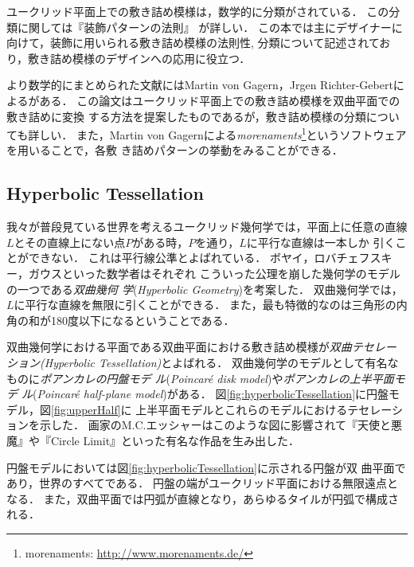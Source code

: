 ユークリッド平面上での敷き詰め模様は，数学的に分類がされている．
この分類に関しては『装飾パターンの法則』
\cite{fujitaｰ201507pattern}が詳しい．
この本では主にデザイナーに向けて，装飾に用いられる敷き詰め模様の法則性,
分類について記述されており，敷き詰め模様のデザインへの応用に役立つ．

より数学的にまとめられた文献にはMartin von Gagern，Jrgen
Richter-Gebertによる\cite{journals/combinatorics/GagernR09}がある．
この論文はユークリッド平面上での敷き詰め模様を双曲平面での敷き詰めに変換
する方法を提案したものであるが，敷き詰め模様の分類についても詳しい．
また，Martin von Gagernによる\emph{morenaments}\footnote{morenaments:
\url{http://www.morenaments.de/}}というソフトウェアを用いることで，各敷
き詰めパターンの挙動をみることができる．

\subsection{Hyperbolic Tessellation}

我々が普段見ている世界を考えるユークリッド幾何学では，平面上に任意の直線
$L$とその直線上にない点$P$がある時，$P$を通り，$L$に平行な直線は一本しか
引くことができない．
これは平行線公準とよばれている．
ボヤイ，ロバチェフスキー，ガウスといった数学者はそれぞれ
こういった公理を崩した幾何学のモデルの一つである\emph{双曲幾何
学}(\textit{Hyperbolic Geometry})を考案した．
双曲幾何学では，$L$に平行な直線を無限に引くことができる．
また，最も特徴的なのは三角形の内角の和が180度以下になるということである．

双曲幾何学における平面である双曲平面における敷き詰め模様が\emph{双曲テセレー
ション}{\it (Hyperbolic Tessellation)}とよばれる．
双曲幾何学のモデルとして有名なものに\emph{ポアンカレの円盤モデ
ル}(\textit{Poincar\'e disk model})や\emph{ポアンカレの上半平面モデ
ル}(\textit{Poincar\'e half-plane model})がある．
図\ref{fig:hyperbolicTessellation}に円盤モデル，図\ref{fig:upperHalf}に
上半平面モデルとこれらのモデルにおけるテセレーションを示した．
画家のM.C.エッシャーはこのような図に影響されて『天使と悪魔』や『Circle
Limit』といった有名な作品を生み出した．

円盤モデルにおいては図\ref{fig:hyperbolicTessellation}に示される円盤が双
曲平面であり，世界のすべてである．
円盤の端がユークリッド平面における無限遠点となる．
また，双曲平面では円弧が直線となり，あらゆるタイルが円弧で構成される．

